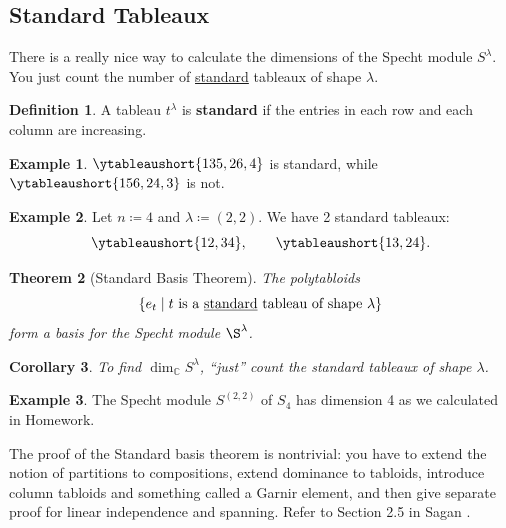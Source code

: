 \documentclass[12pt]{article}
\newcommand{\cx}{\mathbb{C}}
\newcommand\setb[1]{\left \{ #1 \right \}}
\newtheorem{theorem}{Theorem}[section]
\newtheorem{corollary}[theorem]{Corollary}
\theoremstyle{definition}
\newtheorem{definition}[theorem]{Definition}
\newtheorem{example}{Example}[section]
\begin{document}
\subsection{Standard Tableaux}
There is a really nice way to calculate the dimensions of the Specht module $S^{\lambda}$. You just count the number of \underline{standard} tableaux of shape $\lambda$.
\begin{definition}
    A tableau $t^{\lambda}$ is \textbf{standard} if the entries in each row and each column are increasing.
\end{definition}
\begin{example}
    $\ytableaushort{135,26,4}$ is standard, while $\ytableaushort{156,24,3}$ is not.
\end{example}
\begin{example}
    Let $n \coloneqq  4$ and $\lambda \coloneqq  (2,2)$. We have 2 standard tableaux:
    \begin{equation*}
        \ytableaushort{12,34} , \qquad
        \ytableaushort{13,24}.
    \end{equation*}
\end{example}
\begin{theorem}[Standard Basis Theorem]
    The polytabloids 
    \begin{equation}
        \setb{ e_t \mid \text{$t$ is a \underline{standard} tableau of shape $\lambda$} }
    \end{equation}
    form a basis for the Specht module $\S^{\lambda}$.
\end{theorem}
\begin{corollary}
    To find $\dim_{\cx} S^{\lambda}$, ``just'' count the standard tableaux of shape $\lambda$.
\end{corollary}
\begin{example}
    The Specht module $S^{(2,2)}$ of $S_4$ has dimension 4 as we calculated in Homework.
\end{example}
The proof of the Standard basis theorem is nontrivial: you have to extend the notion of partitions to compositions, extend dominance to tabloids, introduce column tabloids and something called a Garnir element, and then give separate proof for linear independence and spanning. Refer to Section 2.5 in Sagan \cite{Sagan}.
\end{document}
